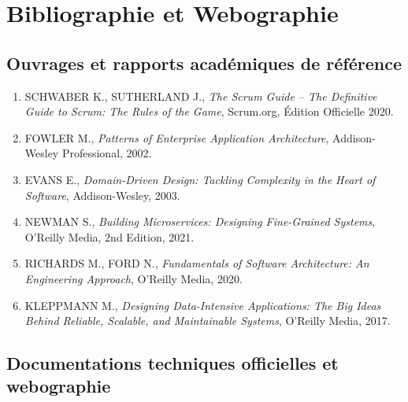 \documentclass[12pt,a4paper,oneside]{report}
\begin{document}
\chapter*{Bibliographie et Webographie}

\section*{Ouvrages et rapports académiques de référence}

\begin{enumerate}
    \item SCHWABER K., SUTHERLAND J., \textit{The Scrum Guide -- The Definitive Guide to Scrum: The Rules of the Game}, Scrum.org, Édition Officielle 2020.
    \item FOWLER M., \textit{Patterns of Enterprise Application Architecture}, Addison-Wesley Professional, 2002.
    \item EVANS E., \textit{Domain-Driven Design: Tackling Complexity in the Heart of Software}, Addison-Wesley, 2003.
    \item NEWMAN S., \textit{Building Microservices: Designing Fine-Grained Systems}, O'Reilly Media, 2nd Edition, 2021.
    \item RICHARDS M., FORD N., \textit{Fundamentals of Software Architecture: An Engineering Approach}, O'Reilly Media, 2020.
    \item KLEPPMANN M., \textit{Designing Data-Intensive Applications: The Big Ideas Behind Reliable, Scalable, and Maintainable Systems}, O'Reilly Media, 2017.
\end{enumerate}

\section*{Documentations techniques officielles et webographie}
\end{document}
